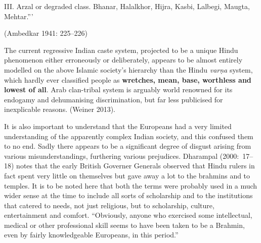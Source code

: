 III. Arzal or degraded class. Bhanar, Halalkhor, Hijra, Kasbi, Lalbegi, Maugta, Mehtar.”’

\vspace{-.3cm}

\begin{flushright}
(Ambedkar 1941: 225–226)
\end{flushright}

The current regressive Indian caste system, projected to be a unique Hindu phenomenon either erroneously or deliberately, appears to be almost entirely modelled on the above Islamic society's hierarchy than the Hindu \textit{varṇa} system, which hardly ever classified people as \textbf{wretches, mean, base, worthless and lowest of all}. Arab clan-tribal system is arguably world renowned for its endogamy and dehumanising discrimination, but far less publicised for inexplicable reasons. (Weiner 2013).


It is also important to understand that the Europeans had a very limited understanding of the apparently complex Indian society, and this confused them to no end. Sadly there appears to be a significant degree of disgust arising from various misunderstandings, furthering various prejudices. Dharampal (2000:~17–18) notes that the early British Governer Generals observed that Hindu rulers in fact spent very little on themselves but gave away a lot to the brahmins and to temples. It is to be noted here that both the terms were probably used in a much wider sense at the time to include all sorts of scholarship and to the institutions that catered to needs, not just religious, but to scholarship, culture, entertainment and comfort. “Obviously, anyone who exercised some intellectual, medical or other professional skill seems to have been taken to be a Brahmin, even by fairly knowledgeable Europeans, in this period.”

